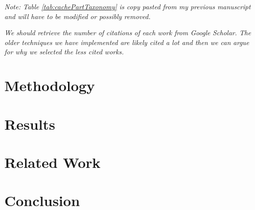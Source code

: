 \textit{Note: Table \ref{tab:cachePartTaxonomy} is copy pasted from my previous manuscript and will have to be modified or possibly removed.}





\textit{We should retrieve the number of citations of each work from Google Scholar.
The older techniques we have implemented are likely cited a lot and then we can argue for why we selected the less cited works.}

\section{Methodology}



\section{Results}


\section{Related Work}


\section{Conclusion}

